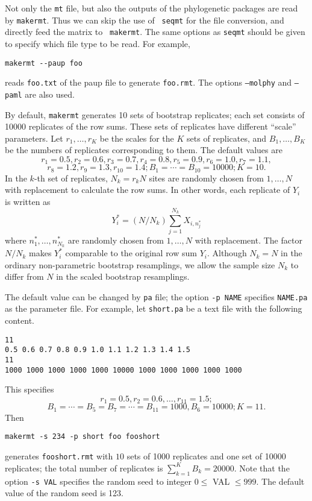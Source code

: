 \documentclass[12pt]{article}
\begin{document}
Not only the {\tt mt} file, but also the outputs of the phylogenetic
packages are read by {\tt makermt}. Thus we can skip the use of {\tt
seqmt} for the file conversion, and directly feed the matrix to {\tt
makermt}.  The same options as {\tt seqmt} should be given to specify
which file type to be read. For example,
\begin{verbatim}
makermt --paup foo
\end{verbatim}
reads {\tt foo.txt} of the paup file to generate {\tt foo.rmt}. The
options {\tt --molphy} and {\tt --paml} are also used.

By default, {\tt makermt} generates 10 sets of bootstrap replicates;
each set consists of 10000 replicates of the row sums.  These sets of
replicates have different ``scale'' parameters.  Let $r_1,\ldots,r_K$ be
the scales for the $K$ sets of replicates, and $B_1,\ldots,B_K$ be the
numbers of replicates corresponding to them. The default values are \[
r_1=0.5, r_2=0.6, r_3=0.7, r_4=0.8, r_5=0.9, r_6=1.0, r_7=1.1, \] \[
r_8=1.2, r_9=1.3, r_{10}=1.4; B_1 = \cdots = B_{10} = 10000; K=10.  \]
In the $k$-th set of replicates, $N_k=r_k N$ sites are randomly chosen
from $1,\ldots,N$ with replacement to calculate the row sums. In other
words, each replicate of $Y_i$ is written as \[ Y^*_{i} = (N/N_k)
\sum_{j=1}^{N_k} X_{i,n^*_j} \] where $n^*_1,\ldots,n^*_{N_k}$ are
randomly chosen from $1,\ldots,N$ with replacement. The factor $N/N_k$
makes $Y^*_i$ comparable to the original row sum $Y_i$. Although $N_k=N$
in the ordinary non-parametric bootstrap resamplings, we allow the
sample size $N_k$ to differ from $N$ in the scaled bootstrap
resamplings.

The default value can be changed by {\tt pa} file; the option {\tt -p
NAME} specifies {\tt NAME.pa} as the parameter file.  For example, let
{\tt short.pa} be a text file with the following content.
\begin{verbatim}
11
0.5 0.6 0.7 0.8 0.9 1.0 1.1 1.2 1.3 1.4 1.5
11
1000 1000 1000 1000 1000 10000 1000 1000 1000 1000 1000
\end{verbatim}
This specifies
\[
 r_1=0.5, r_2=0.6,\ldots,r_{11}=1.5;
\]
\[
B_1=\cdots=B_5=B_7=\cdots=B_{11}=1000, B_6=10000; K=11.
\]
Then
\begin{verbatim}
makermt -s 234 -p short foo fooshort
\end{verbatim}
generates {\tt fooshort.rmt} with $10$ sets of 1000 replicates and one
set of 10000 replicates; the total number of replicates is $\sum_{k=1}^K
B_k= 20000$. Note that the option {\tt -s VAL} specifies the
random seed to integer $0\le$ VAL $\le999$. The default value of the
random seed is 123.
\end{document}
